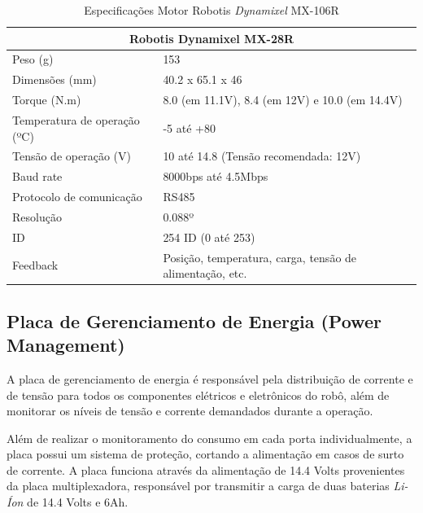 \begin{table}[h!]
	\begin{tabular}{ll}
	
		\multicolumn{2}{c}{Robotis Dynamixel MX-28R}                                            \\ \hline
		Peso (g)                     & 153                                                      \\ \hline
		Dimensões (mm)               & 40.2 x 65.1 x 46                                         \\ \hline
		Torque (N.m)                 & 8.0 (em 11.1V), 8.4 (em 12V) e 10.0 (em 14.4V)           \\ \hline
		Temperatura de operação (ºC) & -5 até +80                                               \\ \hline
		Tensão de operação (V)       & 10 até 14.8 (Tensão recomendada: 12V)                    \\ \hline
		Baud rate                    & 8000bps até 4.5Mbps                                      \\ \hline
		Protocolo de comunicação     & RS485                                                    \\ \hline
		Resolução                    & 0.088º                                                   \\ \hline
		ID                           & 254 ID (0 até 253)                                       \\ \hline
		Feedback                     & Posição, temperatura, carga, tensão de alimentação, etc. \\ \hline
	\end{tabular}
	\caption{Especificações Motor Robotis\textit{ Dynamixel} MX-106R  }
\end{table}



\subsection{Placa de Gerenciamento de Energia (Power Management)}
A placa de gerenciamento de energia é responsável pela distribuição de corrente e de tensão para todos os componentes elétricos e eletrônicos do robô, além de monitorar os níveis de tensão e corrente demandados durante a operação. 

Além de realizar o monitoramento do consumo em cada porta individualmente, a placa possui um sistema de proteção, cortando a alimentação em casos de surto de corrente. A placa funciona através da alimentação de 14.4 Volts provenientes da placa multiplexadora, responsável por transmitir a carga de duas baterias \textit{Li-Íon} de 14.4 Volts e 6Ah.

